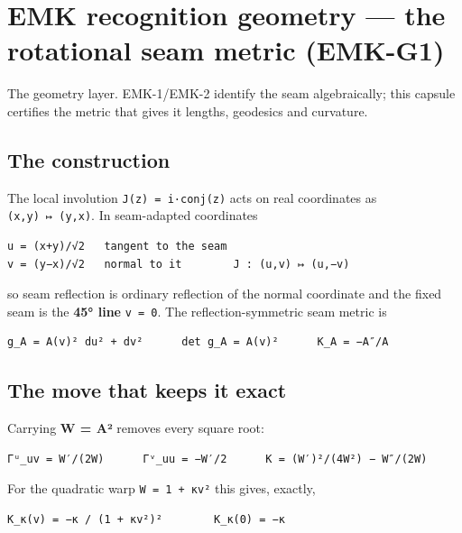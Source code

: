 \hypertarget{emk-recognition-geometry-the-rotational-seam-metric-emk-g1}{%
\chapter{EMK recognition geometry --- the rotational seam metric (EMK-G1)}\label{emk-recognition-geometry-the-rotational-seam-metric-emk-g1}}

The geometry layer. EMK-1/EMK-2 identify the seam algebraically; this
capsule certifies the metric that gives it lengths, geodesics and
curvature.

\hypertarget{the-construction}{%
\section{The construction}\label{the-construction}}

The local involution \texttt{J(z)\ =\ i·conj(z)} acts on real coordinates as
\texttt{(x,y)\ ↦\ (y,x)}. In seam-adapted coordinates

\begin{verbatim}
u = (x+y)/√2   tangent to the seam
v = (y−x)/√2   normal to it        J : (u,v) ↦ (u,−v)
\end{verbatim}

so seam reflection is ordinary reflection of the normal coordinate and
the fixed seam is the \textbf{45° line} \texttt{v\ =\ 0}. The reflection-symmetric seam
metric is

\begin{verbatim}
g_A = A(v)² du² + dv²      det g_A = A(v)²      K_A = −A″/A
\end{verbatim}

\hypertarget{the-move-that-keeps-it-exact}{%
\section{The move that keeps it exact}\label{the-move-that-keeps-it-exact}}

Carrying \textbf{W = A²} removes every square root:

\begin{verbatim}
Γᵘ_uv = W′/(2W)      Γᵛ_uu = −W′/2      K = (W′)²/(4W²) − W″/(2W)
\end{verbatim}

For the quadratic warp \texttt{W\ =\ 1\ +\ κv²} this gives, exactly,

\begin{verbatim}
K_κ(v) = −κ / (1 + κv²)²        K_κ(0) = −κ
\end{verbatim}

